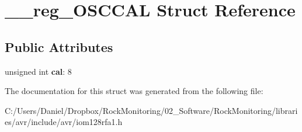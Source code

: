\hypertarget{struct____reg___o_s_c_c_a_l}{}\section{\+\_\+\+\_\+reg\+\_\+\+O\+S\+C\+C\+AL Struct Reference}
\label{struct____reg___o_s_c_c_a_l}
\subsection*{Public Attributes}
\begin{DoxyCompactItemize}
\item 
unsigned int {\bfseries cal}\+: 8\hypertarget{struct____reg___o_s_c_c_a_l_a5e22d97e20d036f3381a968dbe712b76}{}\label{struct____reg___o_s_c_c_a_l_a5e22d97e20d036f3381a968dbe712b76}

\end{DoxyCompactItemize}


The documentation for this struct was generated from the following file\+:\begin{DoxyCompactItemize}
\item 
C\+:/\+Users/\+Daniel/\+Dropbox/\+Rock\+Monitoring/02\+\_\+\+Software/\+Rock\+Monitoring/libraries/avr/include/avr/iom128rfa1.\+h\end{DoxyCompactItemize}
